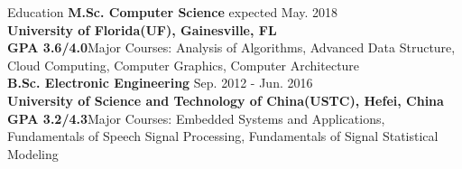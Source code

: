 \documentclass{resume} %
\begin{document}
\vspace{-1.5em}


\begin{rSection}{Education}
{\bf M.Sc. Computer Science} \hfill {expected May. 2018}\\
{\bf University of Florida(UF), Gainesville, FL}\\
{\bf GPA 3.6/4.0}{\qquad Major Courses: Analysis of Algorithms, Advanced Data Structure, Cloud Computing, Computer Graphics, Computer Architecture}\vspace{0.4em}\\
{\bf B.Sc. Electronic Engineering  } \hfill { Sep. 2012 - Jun. 2016} \\
{\bf University of Science and Technology of China(USTC), Hefei, China} \\
{\bf GPA 3.2/4.3}{\qquad Major Courses: Embedded Systems and Applications, Fundamentals of Speech Signal Processing, Fundamentals of Signal Statistical Modeling}
\end{rSection}


\end{document}
